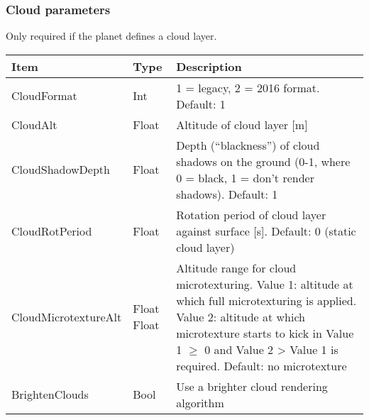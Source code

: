 \documentclass[Orbiter Developer Manual.tex]{subfiles}
\begin{document}


\subsubsection*{Cloud parameters}
Only required if the planet defines a cloud layer.

	\begin{longtable}{ |p{}|p{}|p{}| }
	\hline\rule{0pt}{2ex}
	\textbf{Item} & \textbf{Type} & \textbf{Description}\\
	\hline\rule{0pt}{2ex}
	CloudFormat & Int & 1 = legacy, 2 = 2016 format. Default: 1\\
	\hline\rule{0pt}{2ex}
	CloudAlt & Float & Altitude of cloud layer [m]\\
	\hline\rule{0pt}{2ex}
	CloudShadowDepth & Float & Depth (“blackness”) of cloud shadows on the ground (0-1, where 0 = black, 1 = don’t render shadows). Default: 1\\
	\hline\rule{0pt}{2ex}
	CloudRotPeriod & Float & Rotation period of cloud layer against surface [s]. Default: 0 (static cloud layer)\\
	\hline\rule{0pt}{2ex}
	CloudMicrotextureAlt & Float Float & Altitude range for cloud microtexturing.\newline
	Value 1: altitude at which full microtexturing is applied.\newline
	Value 2: altitude at which microtexture starts to kick in\newline
	Value 1 $\geq$ 0 and Value 2 > Value 1 is required. Default: no microtexture\\
	\hline\rule{0pt}{2ex}
	BrightenClouds & Bool & Use a brighter cloud rendering algorithm\\
	\hline
	\end{longtable}
\end{document}
